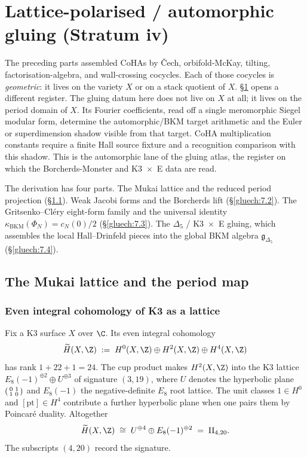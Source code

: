 \section{Lattice-polarised / automorphic gluing (Stratum iv)}
\label{sec:gluing:lattice}
\label{part:gluing-lattice-automorphic}
The preceding parts assembled CoHAs by Čech, orbifold-McKay, tilting, factorisation-algebra, and wall-crossing cocycles. Each of those cocycles is \emph{geometric}: it lives on the variety $X$ or on a stack quotient of $X$. \S\ref{sec:gluing:lattice} opens a different register. The gluing datum here does not live on $X$ at all; it lives on the period domain of $X$. Its Fourier coefficients, read off a single meromorphic Siegel modular form, determine the automorphic/BKM target arithmetic and the Euler or superdimension shadow visible from that target. CoHA multiplication constants require a finite Hall source fixture and a recognition comparison with this shadow. This is the automorphic lane of the gluing atlas, the register on which the Borcherds-Monster and K3~$\times$~E data are read.

The derivation has four parts. The Mukai lattice and the reduced period projection (\S\ref{gluech:7.1}). Weak Jacobi forms and the Borcherds lift (\S\ref{gluech:7.2}). The Gritsenko--Cl\'ery eight-form family and the universal identity $\kappa_{\mathrm{BKM}}(\Phi_N) = c_N(0)/2$ (\S\ref{gluech:7.3}). The $\Delta_5$ / K3~$\times$~E gluing, which assembles the local Hall--Drinfeld pieces into the global BKM algebra $\mathfrak{g}_{\Delta_5}$ (\S\ref{gluech:7.4}).

\subsection{The Mukai lattice and the period map}
\label{gluech:7.1}

\subsubsection{Even integral cohomology of K3 as a lattice}

Fix a K3 surface $X$ over $\C$. Its even integral cohomology
\[
 \widetilde H(X, \Z) \;:=\; H^0(X, \Z) \oplus H^2(X, \Z) \oplus H^4(X, \Z)
\]
has rank $1 + 22 + 1 = 24$. The cup product makes $H^2(X, \Z)$ into the $\mathrm{K3}$ lattice $E_8(-1)^{\oplus 2} \oplus U^{\oplus 3}$ of signature $(3, 19)$, where $U$ denotes the hyperbolic plane $\begin{psmallmatrix} 0 & 1 \\ 1 & 0 \end{psmallmatrix}$ and $E_8(-1)$ the negative-definite $E_8$ root lattice. The unit classes $1 \in H^0$ and $[\mathrm{pt}] \in H^4$ contribute a further hyperbolic plane when one pairs them by Poincar\'e duality. Altogether
\[
 \widetilde H(X, \Z) \;\cong\; U^{\oplus 4} \oplus E_8(-1)^{\oplus 2} \;=\; \mathrm{II}_{4, 20}.
\]
The subscripts $(4, 20)$ record the signature.

